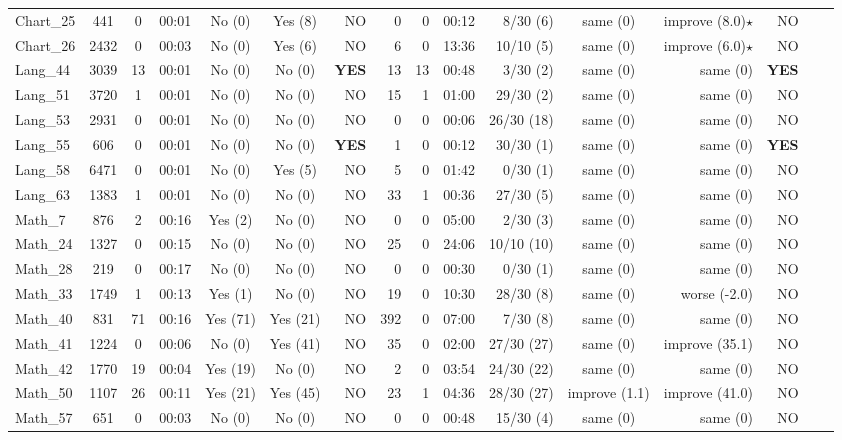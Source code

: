\begin{table*}[htbp]
\begin{tabular}{lcccccrrrrrcrrrr}
Chart\_25 & 441 & 0 & 00:01 & No (0) & Yes (8) & NO & 0 & 0 & 00:12 & 8/30 (6) &  same (0) & improve (8.0)$\star$ & NO\\
Chart\_26 & 2432 & 0 & 00:03 & No (0) & Yes (6) & NO & 6 & 0 & 13:36 & 10/10 (5) &  same (0) & improve (6.0)$\star$ & NO \\
Lang\_44 & 3039 & 13 & 00:01 & No (0) & No (0) & \bf{YES} & 13 & 13 & 00:48 & 3/30 (2) & same (0) & same (0) & \bf{YES}\\
Lang\_51 & 3720 & 1 & 00:01 & No (0) & No (0) & NO & 15 & 1 & 01:00 & 29/30 (2) &  same (0) & same (0) & NO\\
Lang\_53 & 2931 & 0 & 00:01 & No (0) & No (0) & NO & 0 & 0 & 00:06 & 26/30 (18) &  same (0) &  same (0) & NO\\
Lang\_55 & 606 & 0 & 00:01 & No (0) & No (0) & \bf{YES} & 1 & 0 & 00:12 & 30/30 (1) & same (0) & same (0) & \bf{YES}\\
Lang\_58 & 6471 & 0 & 00:01 & No (0) & Yes (5) & NO & 5 & 0 & 01:42 & 0/30 (1) &  same (0) & same (0) & NO\\
Lang\_63 & 1383 & 1 & 00:01 & No (0) & No (0) & NO & 33 & 1 & 00:36 & 27/30 (5) & same (0) & same (0) & NO\\
Math\_7 & 876 & 2 & 00:16 & Yes (2) & No (0) & NO & 0 & 0 & 05:00 & 2/30 (3) & same (0) &  same (0) & NO\\
Math\_24 & 1327 & 0 & 00:15 & No (0) & No (0) & NO & 25 & 0 & 24:06 & 10/10 (10) & same (0) & same (0) & NO\\
Math\_28 & 219 & 0 & 00:17 & No (0) & No (0) & NO & 0 & 0 & 00:30 & 0/30 (1) & same (0) & same (0) & NO\\
Math\_33 & 1749 & 1 & 00:13 & Yes (1) & No (0) & NO & 19 & 0 & 10:30 & 28/30 (8) & same (0) & worse (-2.0) & NO\\
Math\_40 & 831 & 71 & 00:16 & Yes (71) & Yes (21) & NO & 392 & 0 & 07:00 & 7/30 (8) & same (0) & same (0) & NO\\
Math\_41 & 1224 & 0 & 00:06 & No (0) & Yes (41) & NO  & 35 & 0 & 02:00 & 27/30 (27) &  same (0) & improve (35.1) & NO\\
Math\_42 & 1770 & 19 & 00:04 & Yes (19) & No (0) & NO & 2 & 0 & 03:54 & 24/30 (22) &  same (0) & same (0) & NO\\
Math\_50 & 1107 & 26 & 00:11 & Yes (21) & Yes (45) & NO  & 23 & 1 & 04:36 & 28/30 (27) & improve (1.1) & improve (41.0) & NO\\
Math\_57 & 651 & 0 & 00:03 & No (0) & No (0) & NO & 0 & 0 & 00:48 & 15/30 (4) &  same (0) & same (0) & NO\\

\end{tabular}
\end{table*}
